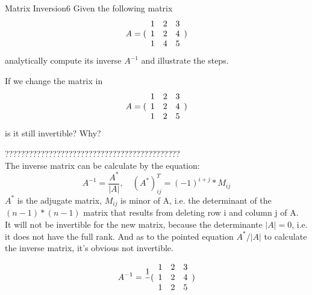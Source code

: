 \begin{questions}

\begin{question}{Matrix Inversion}{6}
Given the following matrix 
\begin{equation*}
     A = ( \begin{array}{c c c} 
     1 & 2 & 3 \\
     1 & 2 & 4 \\
     1 & 4 & 5 \end{array} )
\end{equation*}
analytically compute its inverse $ A^{-1}$ and illustrate the steps.

If we change the matrix in
\begin{equation*}
     A = ( \begin{array}{c c c} 
     1 & 2 & 3 \\
     1 & 2 & 4 \\
     1 & 2 & 5 \end{array} )
\end{equation*}
is it still invertible? Why?

\begin{answer}
????????????????????????????????????????????\\
The inverse matrix can be calculate by the equation:
\begin{equation*}
    A^{-1} = \frac{A^{*}}{|A|}, \quad (A^{*})^{T}_{ij} = (-1)^{i+j}*M_{ij}
\end{equation*}
$A^{*}$ is the adjugate matrix, $M_{ij}$ is minor of A, 
i.e. the determinant of the $(n - 1)*(n - 1)$ matrix that results from deleting row i and column j of A.\\ 

It will not be invertible for the new matrix, because the determinante $|A| = 0$, i.e. it does not have the full rank.
And as to the pointed equation $A^{*} / |A|$ to calculate the inverse matrix, it's obvious not invertible.
\end{answer}
\begin{equation*}
    A^{-1} = \frac{1}{} ( \begin{array}{c c c} 
    1 & 2 & 3 \\
    1 & 2 & 4 \\
    1 & 2 & 5 \end{array} )
\end{equation*}

\end{question}
	


\end{questions}
